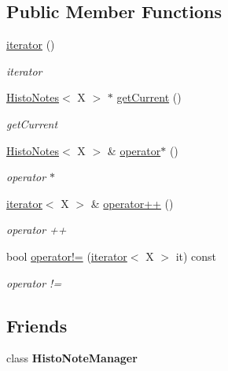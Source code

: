 \subsection*{Public Member Functions}
\begin{DoxyCompactItemize}
\item 
\mbox{\label{class_histo_note_manager_1_1iterator_a3b43451f77d1dd4055d6689ab93e7ff9}} 
\hyperlink{class_histo_note_manager_1_1iterator_a3b43451f77d1dd4055d6689ab93e7ff9}{iterator} ()
\begin{DoxyCompactList}\small\item\em iterator \end{DoxyCompactList}\item 
\hyperlink{class_histo_notes}{Histo\+Notes}$<$ X $>$ $\ast$ \hyperlink{class_histo_note_manager_1_1iterator_a7bdc515ebe62b710ec796452bc8a4e1b}{get\+Current} ()
\begin{DoxyCompactList}\small\item\em get\+Current \end{DoxyCompactList}\item 
\hyperlink{class_histo_notes}{Histo\+Notes}$<$ X $>$ \& \hyperlink{class_histo_note_manager_1_1iterator_a9069f8396167a1e36d0b018403a49ab6}{operator$\ast$} ()
\begin{DoxyCompactList}\small\item\em operator $\ast$ \end{DoxyCompactList}\item 
\hyperlink{class_histo_note_manager_1_1iterator}{iterator}$<$ X $>$ \& \hyperlink{class_histo_note_manager_1_1iterator_a8154f56529c02508425568db0cecccaf}{operator++} ()
\begin{DoxyCompactList}\small\item\em operator ++ \end{DoxyCompactList}\item 
bool \hyperlink{class_histo_note_manager_1_1iterator_a960a22fd8f1f6a1140bd94bd2a311cb8}{operator!=} (\hyperlink{class_histo_note_manager_1_1iterator}{iterator}$<$ X $>$ it) const
\begin{DoxyCompactList}\small\item\em operator != \end{DoxyCompactList}\end{DoxyCompactItemize}
\subsection*{Friends}
\begin{DoxyCompactItemize}
\item 
\mbox{\label{class_histo_note_manager_1_1iterator_add410ceb538a9963f9282fe3c1db096d}} 
class {\bfseries Histo\+Note\+Manager}
\end{DoxyCompactItemize}


